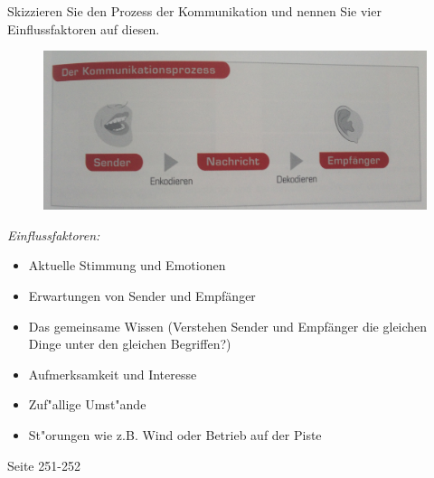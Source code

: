 \begin{question}{4}
Skizzieren Sie den Prozess der Kommunikation und nennen Sie vier Einflussfaktoren auf diesen.
\end{question}
\begin{solution}
\begin{figure}[H]
  \centering
  \includegraphics[width=12cm]{pic/kommunikation.jpg}
  \label{fig:kommunikation}
\end{figure}
\emph{Einflussfaktoren:}
\begin{itemize}
\item Aktuelle Stimmung und Emotionen
\item Erwartungen von Sender und Empfänger
\item Das gemeinsame Wissen (Verstehen Sender und Empfänger die gleichen Dinge unter den gleichen Begriffen?)
\item Aufmerksamkeit und Interesse
\item Zuf"allige Umst"ande
\item St"orungen wie z.B. Wind oder Betrieb auf der Piste
\end{itemize}
 Seite 251-252
\end{solution}

